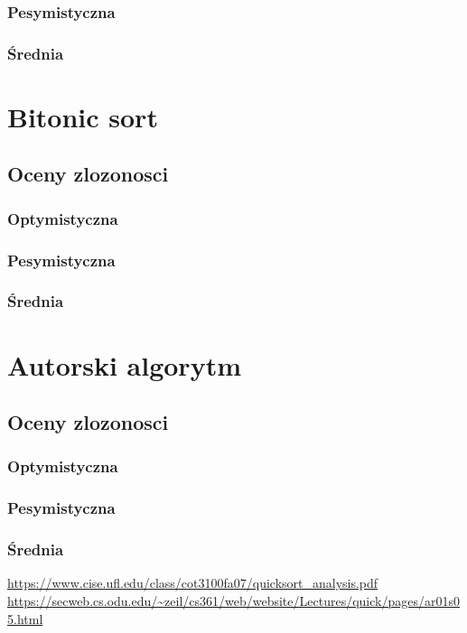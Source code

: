 \subsubsection{Pesymistyczna}
\subsubsection{Średnia}
\section{Bitonic sort}
\subsection{Oceny zlozonosci}
\subsubsection{Optymistyczna}
\subsubsection{Pesymistyczna}
\subsubsection{Średnia}
\section{Autorski algorytm}
\subsection{Oceny zlozonosci}
\subsubsection{Optymistyczna}
\subsubsection{Pesymistyczna}
\subsubsection{Średnia}

\begin{thebibliography}{99}
 \url{https://www.cise.ufl.edu/class/cot3100fa07/quicksort_analysis.pdf}
\url{https://secweb.cs.odu.edu/~zeil/cs361/web/website/Lectures/quick/pages/ar01s05.html}
\end{thebibliography}

